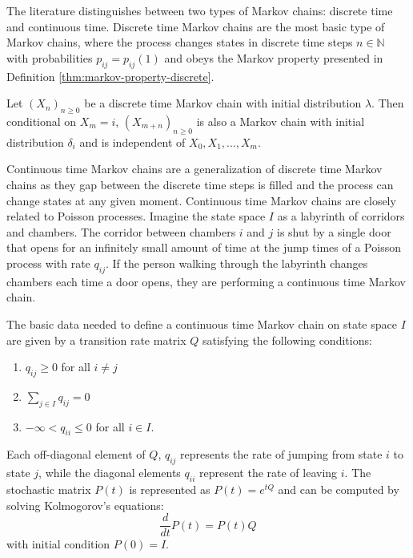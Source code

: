 	The literature distinguishes between two types of Markov chains: discrete time and continuous time.
	Discrete time Markov chains are the most basic type of Markov chains, where the process
	changes states in discrete time steps $n \in \mathbb{N}$ with probabilities $p_{ij} = p_{ij}(1)$
	and obeys the Markov property presented in Definition \ref{thm:markov-property-discrete}.
	
	\begin{defn}
	\label{thm:markov-property-discrete}
	Let $(X_n)_{n \ge 0}$ be a discrete time Markov chain with initial distribution $\lambda$.
	Then conditional on $X_m = i$, $(X_{m + n})_{n \ge 0}$ is also a Markov chain with initial
	distribution $\delta_i$ and is independent of $X_0, X_1, ..., X_m$.
	\end{defn}
	
	Continuous time Markov chains are a generalization of discrete time Markov chains as they
	gap between the discrete time steps is filled and the process can change states at any given moment.
	Continuous time Markov chains are closely related to Poisson processes. Imagine the state
	space $I$ as a labyrinth of corridors and chambers. The corridor between chambers $i$ and $j$
	is shut by a single door that opens for an infinitely small amount of time at the jump times of
	a Poisson process with rate $q_{ij}$. If the person walking through the labyrinth changes
	chambers each time a door opens, they are performing
	a continuous time Markov chain.

	
	The basic data needed to define a continuous time Markov chain on state space $I$ are
	given by a transition rate matrix $Q$ satisfying the following conditions:
	
	\begin{enumerate}
		\item $q_{ij} \ge 0$ for all $i \ne j$
		\item $\sum_{j \in I} q_{ij} = 0$
		\item $-\infty < q_{ii} \le 0$ for all $i \in I$.
	\end{enumerate}
	
	Each off-diagonal element of $Q$, $q_{ij}$ represents the rate of jumping from state $i$ to state $j$,
	while the diagonal elements $q_{ii}$ represent the rate of leaving $i$. The stochastic matrix
	$P(t)$ is represented as $P(t) = e^{tQ}$ and can be computed by solving Kolmogorov's equations:
	\begin{equation}
		\frac{d}{dt}P(t) = P(t)Q
	\end{equation}
	with initial condition $P(0) = I$.


